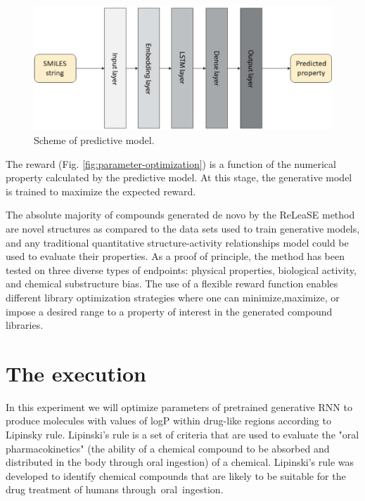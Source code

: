 \documentclass[a4paper]{article}
\begin{document}
\begin{figure}[htbp]
    \centering
        \includegraphics[width=\textwidth]{smiles-to-predicted-property.png}
    \caption{Scheme of predictive model.}
    \label{fig:smiles-to-predicted-property}
\end{figure}
	
The reward (Fig. \ref{fig:parameter-optimization}) is a function of the numerical property calculated by the predictive model. At this stage, the generative model is trained to maximize the expected reward.


The absolute majority of compounds generated de novo by the ReLeaSE method are novel structures as compared to the data sets used to train generative models, and any traditional quantitative structure-activity relationships model could be used to evaluate their properties.
As a proof of principle, the method has been tested on three diverse types of endpoints: physical properties, biological activity, and chemical substructure bias. The use of a flexible reward function enables different library optimization strategies where one can minimize,maximize, or impose a desired range to a property of interest in the generated compound libraries.

\section{The execution}\label{sec:The execution}

In this experiment we will optimize parameters of pretrained generative RNN to produce molecules with values of logP within drug-like regions according to Lipinsky rule. Lipinski's rule is a set of criteria that are used to evaluate the "oral pharmacokinetics" (the ability of a chemical compound to be absorbed and distributed in the body through oral ingestion) of a chemical. Lipinski's rule was developed to identify chemical compounds that are likely to be suitable for the drug treatment of humans through oral ingestion. 
\end{document}
